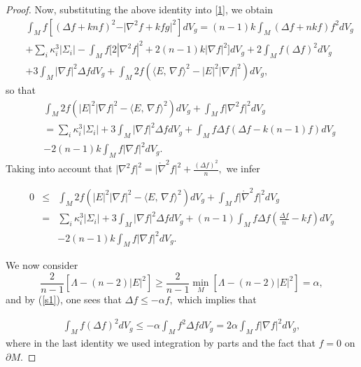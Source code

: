 \documentclass{amsart}
\numberwithin{equation}{section}
\begin{document}
\begin{proof}
		Now, substituting the above identity into \eqref{1}, we obtain
		\begin{eqnarray*}
			&&\int_{M}f\left[\left(\Delta f  + knf\right)^2 - \vert \nabla^2f+kfg\vert^{2}\right]dV_g = (n-1)k\int_{M}\left(\Delta f +nkf\right)f^2dV_g\nonumber\\
			&&+\sum_{i}\kappa_{i}^3\vert\Sigma_{i}\vert - \int_{M}f\Bigg[ 2|\nabla^{2}f|^{2} +  2(n-1)k|\nabla f|^{2}\Bigg]dV_g + 2\int_{M}f(\Delta f)^2 dV_{g}\nonumber\\
			&& + 3\int_{M}|\nabla f|^{2}\Delta fdV_g + \int_{M}2f\left(\langle E,\,\nabla f\rangle^{2} - |E|^2|\nabla f|^{2}	\right)dV_g,
		\end{eqnarray*}
		so that
		\begin{eqnarray*}
			&&\int_{M}2f\left(|E|^2|\nabla f|^{2}-\langle E,\,\nabla f\rangle^{2} 	\right)dV_{g}+\int_{M}f\vert\nabla^2f\vert^{2}dV_{g} \nonumber\\
			&& =\sum_{i}\kappa_{i}^3\vert\Sigma_{i}\vert   + 3\int_{M}|\nabla f|^{2}\Delta fdV_{g}  + \int_{M}f\Delta f(\Delta f - k(n-1)f)dV_{g}\nonumber\\&& - 2(n-1)k\int_{M}f|\nabla f|^{2}dV_{g}.
		\end{eqnarray*} Taking into account that $\vert\nabla^2f\vert^{2} = \vert\mathring{\nabla}^2f\vert^{2} + \frac{(\Delta f)^{2}}{n},$ we infer
	
		\begin{eqnarray}
		\label{plmn4561}
			0 &\leq&\int_{M}2f\left(|E|^2|\nabla f|^{2}-\langle E,\,\nabla f\rangle^{2} 	\right)dV_g+\int_{M}f\vert\mathring{\nabla}^2f\vert^{2}dV_g \nonumber\\
			&=&\sum_{i}\kappa_{i}^3\vert\Sigma_{i}\vert   + 3\int_{M}|\nabla f|^{2}\Delta fdV_g  + (n-1)\int_{M}f\Delta f\left(\frac{\Delta f}{n} - kf\right)dV_g\nonumber\\&& - 2(n-1)k\int_{M}f|\nabla f|^{2}dV_g.
		\end{eqnarray}
		
		We now consider 
		\[
 \dfrac{2}{n - 1} \left[ \Lambda - (n - 2) |E|^2 \right] \geq  \dfrac{2}{n - 1}\min_{M}\left[ \Lambda - (n - 2)  |E|^2 \right] = \alpha,
\] and by (\ref{s1}), one sees that $\Delta f\leq -\alpha f,$ which implies that

\begin{eqnarray}
\label{kljhjçp}
			\int_{M}f(\Delta f)^{2}dV_g \leq -\alpha\int_{M}f^{2}\Delta fdV_g = 2\alpha \int_{M}f\vert\nabla f\vert^{2}dV_g,
		\end{eqnarray}
		where in the last identity we used integration by parts and the fact that $f=0$ on $\partial M.$ 
		

\end{proof}
\end{document}

